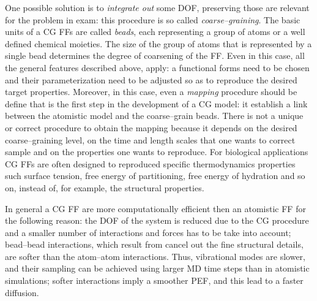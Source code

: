 One possible solution is to \textit{integrate out} some \ac{DOF}, preserving those are relevant for the problem in exam: this procedure is so called \textit{coarse--graining}. The basic units of a \ac{CG} \acp{FF} are called \textit{beads}, each representing a group of atoms or a well defined chemical moieties. The size of the group of atoms that is represented by a single bead determines the degree of coarsening of the \ac{FF}. Even in this case, all the general features described above, apply: a functional forms need to be chosen and their parameterization need to be adjusted so as to reproduce the desired target properties. Moreover, in this case, even a \textit{mapping} procedure should be define that is the first step in the development of a \ac{CG} model: it establish a link between the atomistic model and the coarse--grain beads. There is not a unique or correct procedure to obtain the mapping because it depends on the desired coarse--graining level, on the time and length scales that one wants to correct sample and on the properties one wants to reproduce. For biological applications \ac{CG} \acp{FF} are often designed to reproduced specific thermodynamics properties such surface tension, free energy of partitioning, free energy of hydration and so on, instead of, for example, the structural properties.

In general a \ac{CG} \ac{FF} are more computationally efficient then an atomistic \ac{FF} for the following reason: the \ac{DOF} of the system is reduced due to the \ac{CG} procedure and a smaller number of interactions and forces has to be take into account; bead--bead interactions, which result from cancel out the fine structural details, are softer than the atom--atom interactions. Thus, vibrational modes are slower, and their sampling can be achieved using larger \ac{MD} time steps than in atomistic simulations; softer interactions imply a smoother \ac{PEF}, and this lead to a faster diffusion.


